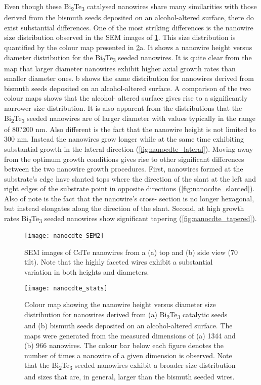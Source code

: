 Even though these Bi\textsubscript{2}Te\textsubscript{3} catalysed nanowires share many similarities with those derived from the bismuth seeds deposited on an alcohol-altered surface, there do exist substantial differences.
One of the most striking differences is the nanowire size distribution observed in the SEM images of \cref{fig:nanocdte_SEM2}.
This size distribution is quantified by the colour map presented in \cref{fig:nanocdte_stats}a.
It shows a nanowire height versus diameter distribution for the Bi\textsubscript{2}Te\textsubscript{3} seeded nanowires.
It is quite clear from the map that larger diameter nanowires exhibit higher axial growth rates than smaller diameter ones.
b shows the same distribution for nanowires derived from bismuth seeds deposited on an alcohol-altered surface.
A comparison of the two colour maps shows that the alcohol- altered surface gives rise to a significantly narrower size distribution.
It is also apparent from the distributions that the Bi\textsubscript{2}Te\textsubscript{3} seeded nanowires are of larger diameter with values typically in the range of 80?200 nm.
Also different is the fact that the nanowire height is not limited to 300 nm.
Instead the nanowires grow longer while at the same time exhibiting substantial growth in the lateral direction (\cref{fig:nanocdte_lateral}).
Moving away from the optimum growth conditions gives rise to other significant differences between the two nanowire growth procedures.
First, nanowires formed at the substrate's edge have slanted tops where the direction of the slant at the left and right edges of the substrate point in opposite directions (\cref{fig:nanocdte_slanted}).
Also of note is the fact that the nanowire's cross- section is no longer hexagonal, but instead elongates along the direction of the slant.
Second, at high growth rates Bi\textsubscript{2}Te\textsubscript{3} seeded nanowires show significant tapering (\cref{fig:nanocdte_tapered}).
\begin{figure}
 \centering \texttt{[image: nanocdte\_SEM2]}
 \caption[SEM image of CdTe nanowires]{\label{fig:nanocdte_SEM2}SEM images of CdTe nanowires from a (a) top and (b) side view (70\degree{} tilt).
  Note that the highly faceted wires exhibit a substantial variation in both heights and diameters.}
\end{figure}
\begin{figure}
 \centering \texttt{[image: nanocdte\_stats]}
 \caption[CdTe nanowire dimension colourmap]{\label{fig:nanocdte_stats}Colour map showing the nanowire height versus diameter size distribution for nanowires derived from (a) Bi\textsubscript{2}Te\textsubscript{3} catalytic seeds and (b) bismuth seeds deposited on an alcohol-altered surface.
  The maps were generated from the measured dimensions of (a) 1344 and (b) 966 nanowires.
  The colour bar below each figure denotes the number of times a nanowire of a given dimension is observed.
  Note that the Bi\textsubscript{2}Te\textsubscript{3} seeded nanowires exhibit a broader size distribution and sizes that are, in general, larger than the bismuth seeded wires.}
\end{figure}
